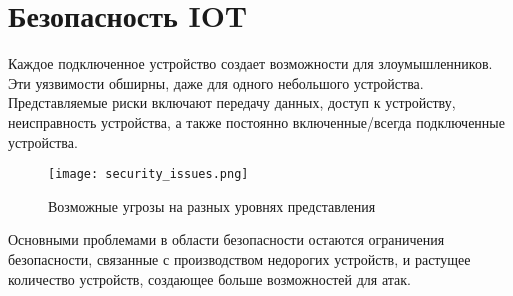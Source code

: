 \section{Безопасность IOT}
Каждое подключенное устройство создает возможности для злоумышленников. Эти уязвимости обширны, даже
для одного небольшого устройства. Представляемые риски включают передачу данных, доступ к устройству, неисправность
устройства, а также постоянно включенные/всегда подключенные устройства.\cite{DeisgOfIOT}
\begin{figure}[h!]
    \centering
    \texttt{[image: security\_issues.png]}
    \caption{Возможные угрозы на разных уровнях представления}
    \label{fig:task5:graph}
\end{figure}
Основными проблемами в области безопасности остаются ограничения безопасности, связанные с производством недорогих устройств, и растущее количество устройств, создающее больше возможностей для атак.

